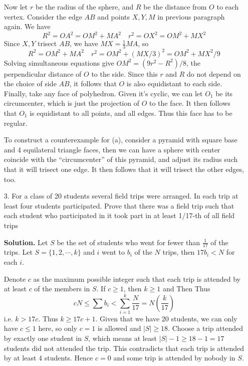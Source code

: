 \documentclass[11pt,a4paper]{article}
\begin{document}
\begin{enumerate}
    Now let $r$ be the radius of the sphere, and $R$ be the distance from $O$ to each vertex. 
    Consider the edge $AB$ and points $X, Y, M$ in previous paragraph again. 
    We have 
    \[
    R^2=OA^2=OM^2+MA^2\quad 
    r^2=OX^2=OM^2+MX^2
    \]
    Since $X, Y$ trisect $AB$, we have $MX=\frac 13 MA$, so 
    \[
    R^2=OM^2+MA^2\quad r^2=OM^2+(MX/3)^2=OM^2+MX^2/9
    \]
    Solving simultaneous equations give $OM^2=(9r^2-R^2)/8$, the perpendicular distance of $O$ to the side. 
    Since this $r$ and $R$ do not depend on the choice of side $AB$, 
    it follows that $O$ is also equidistant to each side. 
    Finally, take any face of polyhedron. 
    Given it's cyclic, we can let $O_1$ be its circumcenter, 
    which is just the projection of $O$ to the face. 
    It then follows that $O_1$ is equidistant to all points, and all edges. 
    Thus this face has to be regular. 
    
    To construct a counterexample for (a), 
    consider a pyramid with square base and 4 equilateral triangle faces, 
    then we can have a sphere with center coincide with the ``circumcenter'' of this pyramid, and adjust its radius such that it will trisect one edge. 
    It then follows that it will trisect the other edges, too. 
    
    \item[3.] For a class of 20 students several field trips were arranged. In each trip at least four students participated. Prove that there was a field trip such that each student who participated
    in it took part in at least 1/17-th of all field trips
    
    \textbf{Solution.} 
    Let $S$ be the set of students who went for fewer than $\frac{1}{17}$ of the trips. 
    Let $S=\{1, 2, \cdots, k\}$ and $i$ went to $b_i$ of the $N$ trips, then 
    $17b_i<N$ for each $i$. 
    
    Denote $c$ as the maximum possible integer such that each trip is attended by at least $c$ of the members in $S$. If $c\ge 1$, then $k\ge 1$ and 
    Then 
    Thus 
    \[
    cN\le \sum b_i < \sum_{i=1}^k \frac{N}{17} = N(\frac{k}{17})
    \]
    i.e. $k > 17c$. Thus $k\ge 17c+1$. 
    Given that we have 20 students, we can only have $c\le 1$ here, so only $c=1$ is allowed and $|S|\ge 18$. 
    Choose a trip attended by exactly one student in $S$, 
    which means at least $|S|-1\ge 18-1=17$ students did not attended the trip. 
    This contradicts that each trip is attended by at least 4 students. 
    Hence $c=0$ and some trip is attended by nobody in $S$. 
    

\end{enumerate}
\end{document}
